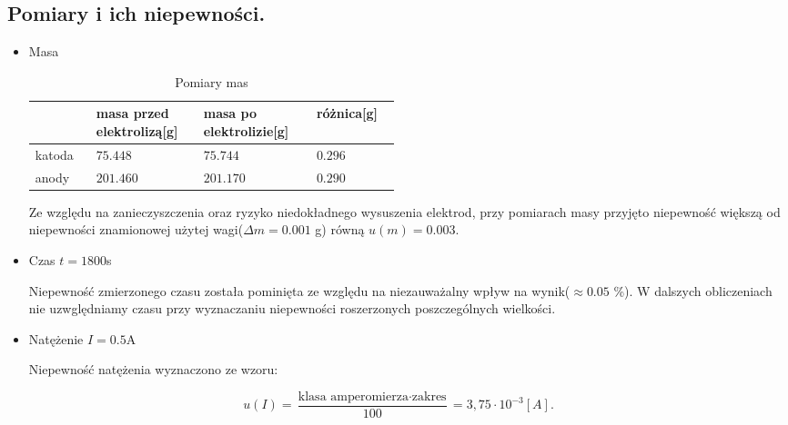 \documentclass [a4paper,11pt]{article}
\begin{document}
	\subsection{Pomiary i ich niepewności.}
	\begin{itemize}
		\item Masa
			
			\begin{table}
				\label{tab:masaPom}
				\caption{Pomiary mas}
				\begin{center}
				\begin{tabular}{p{0.1\linewidth}|p{0.13\linewidth}|p{0.15\linewidth}|p{0.1\linewidth}}
					&masa przed elektrolizą[g]&masa po elektrolizie[g]& różnica[g]\\
					\hline
					katoda&$75.448$&$75.744$&$0.296$ \\
					\hline
					anody &$201.460$&$201.170$&$0.290$ \\
				\end{tabular} 
					\end{center}	
			\end{table}
			

		Ze względu na zanieczyszczenia oraz ryzyko niedokładnego wysuszenia elektrod, przy pomiarach masy przyjęto niepewność większą od niepewności znamionowej użytej wagi($\Delta m=0.001$ g) równą $u(m)=0.003$. 
		
		\item Czas $ t=1800$s
		
		Niepewność zmierzonego czasu została pominięta ze względu na niezauważalny wpływ na wynik($\approx0.05$ \%). W dalszych obliczeniach nie uzwględniamy czasu 
		przy wyznaczaniu niepewności roszerzonych poszczególnych wielkości.
		
		\item Natężenie $I=0.5$A
		
		Niepewność natężenia wyznaczono ze wzoru:
	\end{itemize}
	\begin{equation}
	\label{eq:amper}
	u(I) = \frac{\text{klasa amperomierza} \cdot \text{zakres}}{100} = 3,75 \cdot 10^{-3} [A].
	\end{equation}
\end{document}
